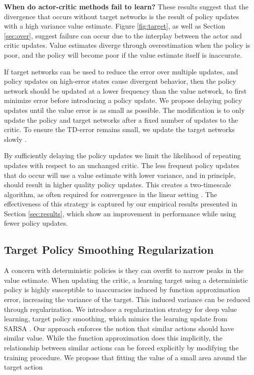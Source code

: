 \documentclass{article}
\begin{document}
\textbf{When do actor-critic methods fail to learn?}
These results suggest that the divergence that occurs without target networks is the result of policy updates with a high variance value estimate. Figure \ref{fig:target}, as well as Section \ref{sec:over}, suggest failure can occur due to the interplay between the actor and critic updates. Value estimates diverge through overestimation when the policy is poor, and the policy will become poor if the value estimate itself is inaccurate. 

If target networks can be used to reduce the error over multiple updates, and policy updates on high-error states cause divergent behavior, then the policy network should be updated at a lower frequency than the value network, to first minimize error before introducing a policy update.
We propose delaying policy updates until the value error is as small as possible. 
The modification is to only update the policy and target networks after a fixed number of updates  to the critic. To ensure the TD-error remains small, we update the target networks slowly . 

By sufficiently delaying the policy updates we limit the likelihood of repeating updates with respect to an unchanged critic. The less frequent policy updates that do occur will use a value estimate with lower variance, and in principle, should result in higher quality policy updates. This creates a two-timescale algorithm, as often required for convergence in the linear setting \cite{konda2003onactor}. The effectiveness of this strategy is captured by our empirical results presented in Section \ref{sec:results}, which show an improvement in performance while using fewer policy updates. 

\subsection{Target Policy Smoothing Regularization} \label{sec:TPN}


A concern with deterministic policies is they can overfit to narrow peaks in the value estimate. When updating the critic, a learning target using a deterministic policy is highly susceptible to inaccuracies induced by function approximation error, increasing the variance of the target. This induced variance can be reduced through regularization. We introduce a regularization strategy for deep value learning, target policy smoothing, which mimics the learning update from SARSA \cite{sutton1998reinforcement}. Our approach enforces the notion that similar actions should have similar value. While the function approximation does this implicitly, the relationship between similar actions can be forced explicitly by modifying the training procedure. We propose that fitting the value of a small area around the target action
\end{document}
